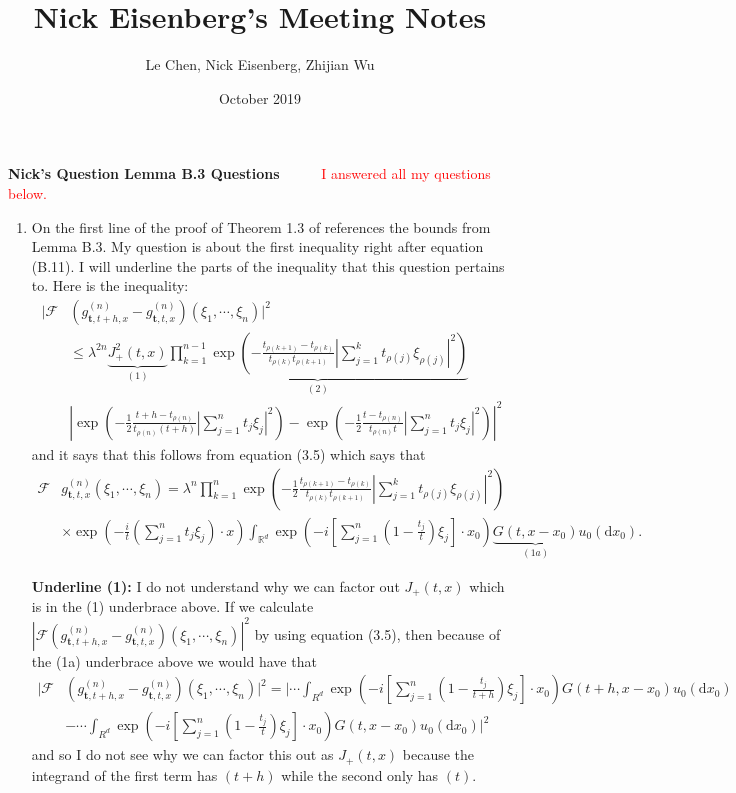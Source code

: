 \documentclass[a4paper,11pt]{article}
\title{Nick Eisenberg's Meeting Notes}
\author{Le Chen, Nick Eisenberg, Zhijian Wu}
\date{October 2019}
\numberwithin{equation}{section}
\theoremstyle{plain}
\theoremstyle{definition}
\newcommand{\ud}{\ensuremath{\mathrm{d} }}
\newcommand{\R}{\mathbb{R}}
\newcounter{NQ}
\newenvironment{NickQuestion}[1][] %
{\refstepcounter{NQ}
	\begin{mdframed}[backgroundcolor=lightgray]\textbf{Nick's Question \theNQ \: #1~~}~~~\noindent}%
	{\end{mdframed}}
\numberwithin{NQ}{section}
\numberwithin{LQ}{section}
\numberwithin{ZQ}{section}
\begin{document}
\begin{NickQuestion}[Lemma B.3 Questions]
	\textcolor{red}{I answered all my questions below.}
	
	\begin{enumerate}
		\item On the first line of the proof of Theorem 1.3 of \cite{BC2017} references the bounds from Lemma B.3. My question is about the first inequality right after equation (B.11). I will underline the parts of the inequality that this question pertains to. Here is the inequality:
		\begin{align*}
			| \mathcal{F} & (g_{ \textbf{t}, t+h, x }^{(n)}  - g_{ \textbf{t}, t, x }^{(n)} ) (\xi_1 , \cdots , \xi_n)|^2 
		\\& \le \lambda^{2n} \underbrace{ J_+^2(t,x) }_{(1)}   \underbrace{ \prod_{k=1}^{n-1} \exp\left( - \frac{ t_{\rho(k+1)}  - t_{\rho(k)} }{ t_{\rho(k)}t_{\rho(k+1)} } \left| \sum_{j=1}^k t_{\rho(j)}\xi_{\rho(j)} \right|^2  \right) }_{(2)}
		\\&  \left| \exp\left( -\frac{1}{2} \frac{ t+h  - t_{\rho(n)} }{ t_{\rho(n)} (t+h) } \left| \sum_{j=1}^n t_j\xi_j \right|^2  \right)  -  \exp\left( -\frac{1}{2} \frac{ t - t_{\rho(n)} }{ t_{\rho(n)} t} \left| \sum_{j=1}^n t_j\xi_j \right|^2  \right)   \right|^2
		\end{align*}
	and it says that this follows from equation (3.5) which says that 
		\begin{align}
			 \mathcal{F} & g_{ \textbf{t}, t, x }^{(n)} (\xi_1 , \cdots , \xi_n) = \lambda^n \prod_{k=1}^n \exp\left( -\frac{1}{2}\frac{ t_{\rho(k+1)}  - t_{\rho(k)} }{ t_{\rho(k)}t_{\rho(k+1)} } \left| \sum_{j=1}^k t_{\rho(j)}\xi_{\rho(j)} \right|^2 \right)
			 \\& \times \exp \left( -\frac{i}{t} \left( \sum_{j=1}^n t_j \xi_j \right) \cdot x \right) \int_{\R^d} \exp \left( -i \left[ \sum_{j=1}^n \left( 1- \frac{t_j}{t} \right) \xi_j  \right] \cdot x_0 \right) \underbrace{ G(t,x-x_0) }_{(1a)} u_0(\ud x_0).
		\end{align}
		
\textbf{Underline (1):} I do not understand why we can factor out $J_+(t,x)$ which is in the (1) underbrace above. If we calculate $	| \mathcal{F} (g_{ \textbf{t}, t+h, x }^{(n)}  - g_{ \textbf{t}, t, x }^{(n)} ) (\xi_1 , \cdots , \xi_n)|^2 $ by using equation (3.5), then because of the (1a) underbrace above we would have that 
	\begin{align*}
			| \mathcal{F} & (g_{ \textbf{t}, t+h, x }^{(n)}  - g_{ \textbf{t}, t, x }^{(n)} ) (\xi_1 , \cdots , \xi_n)|^2 = \Bigg| \cdots \int_{R^d} \exp \left( -i \left[ \sum_{j=1}^n \left( 1- \frac{t_j}{t+h} \right) \xi_j  \right] \cdot x_0 \right)G(t+h,x-x_0)u_0(\ud x_0) 
			\\& - \cdots \int_{R^d} \exp \left( -i \left[ \sum_{j=1}^n \left( 1- \frac{t_j}{t} \right) \xi_j  \right] \cdot x_0 \right)G(t,x-x_0)u_0(\ud x_0) \Bigg|^2
	\end{align*}
and so I do not see why we can factor this out as $J_+(t,x)$ because the integrand of the first term has $(t+h)$ while the second only has $(t)$. 


\end{enumerate}
\end{NickQuestion}
\end{document}

